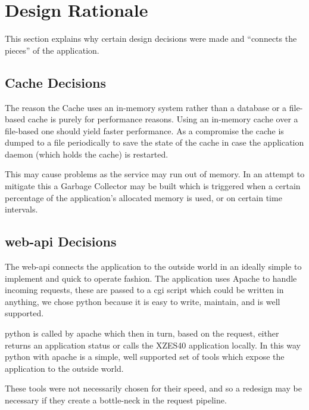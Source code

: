 \section{Design Rationale}

This section explains why certain design decisions were made and ``connects the pieces'' of the application.

\subsection{Cache Decisions}

The reason the Cache uses an in-memory system rather than a database or a file-based cache is purely for performance reasons.
Using an in-memory cache over a file-based one should yield faster performance.
As a compromise the cache is dumped to a file periodically to save the state of the cache in case the application daemon (which holds the cache) is restarted.

This may cause problems as the service may run out of memory.
In an attempt to mitigate this a Garbage Collector may be built which is triggered when a certain percentage of the application's allocated memory is used, or on certain time intervals.
 
\subsection{\gls{web-api} Decisions}

The \gls{web-api} connects the application to the outside world in an ideally simple to implement and quick to operate fashion.
The application uses Apache to handle incoming requests, these are passed to a \gls{cgi} script which could be written in anything, we chose \gls{python} because it is easy to write, maintain, and is well supported.

\gls{python} is called by \gls{apache} which then in turn, based on the request, either returns an application status or calls the XZES40 application locally.
In this way \gls{python} with \gls{apache} is a simple, well supported set of tools which expose the application to the outside world.

These tools were not necessarily chosen for their speed, and so a redesign may be necessary if they create a bottle-neck in the request pipeline.

